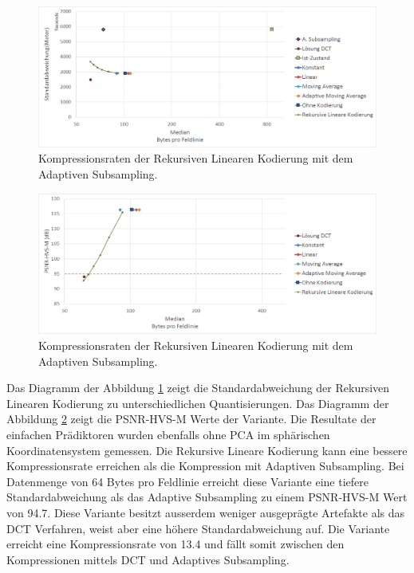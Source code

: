 \begin{figure}[!htbp]
	\center
	\includegraphics[width=1\textwidth,keepaspectratio]{./pictures/resultate/loesung2/variante2/resultate.png}
	
	\caption{Kompressionsraten der Rekursiven Linearen Kodierung mit dem Adaptiven Subsampling.}
	\label{resultate:loesung2:adaptive:median}
\end{figure}
\begin{figure}[!htbp]
	\includegraphics[width=1\textwidth,keepaspectratio]{./pictures/resultate/loesung2/variante2/resultate_psnr.png}
	
	\caption{Kompressionsraten der Rekursiven Linearen Kodierung mit dem Adaptiven Subsampling.}
	\label{resultate:loesung2:adaptive:median_psnr}
\end{figure}
Das Diagramm der Abbildung \ref{resultate:loesung2:adaptive:median} zeigt die Standardabweichung der Rekursiven Linearen Kodierung zu unterschiedlichen Quantisierungen. Das Diagramm der Abbildung \ref{resultate:loesung2:adaptive:median_psnr} zeigt die PSNR-HVS-M Werte der Variante. Die Resultate der einfachen Prädiktoren wurden ebenfalls ohne PCA im sphärischen Koordinatensystem gemessen. Die Rekursive Lineare Kodierung kann eine bessere Kompressionsrate erreichen als die Kompression mit Adaptiven Subsampling. Bei Datenmenge von 64 Bytes pro Feldlinie erreicht diese Variante eine tiefere Standardabweichung als das Adaptive Subsampling zu einem PSNR-HVS-M Wert von 94.7. Diese Variante besitzt ausserdem weniger ausgeprägte Artefakte als das DCT Verfahren, weist aber eine höhere Standardabweichung auf. Die Variante erreicht eine Kompressionsrate von 13.4 und fällt somit zwischen den Kompressionen mittels DCT und Adaptives Subsampling.

